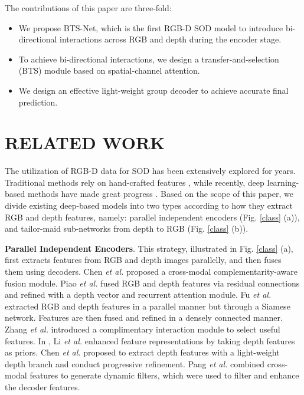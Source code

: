 \documentclass{article}
\begin{document}
The contributions of this paper are three-fold:
\vspace{-0.2cm}
\begin{itemize}
  \item We propose BTS-Net, which is the first RGB-D SOD model to introduce bi-directional interactions across RGB and depth during the encoder stage. \vspace{-0.2cm}
  
  \item To achieve bi-directional interactions, we design a transfer-and-selection (BTS) module based on spatial-channel attention. \vspace{-0.2cm}
  
  \item We design an effective light-weight group decoder to achieve accurate final prediction.
\end{itemize}





\section{RELATED WORK}\vspace{-0.2cm}

The utilization of RGB-D data for SOD has been extensively explored for years. Traditional methods rely on hand-crafted features \cite{cheng2014Depth,2013An,2012Context,2015Exploiting}, while recently, deep learning-based methods have made great progress \cite{PCF,HDFNet,UCNet,DRMA,JLDCF,SSF,cmMS,PGAR,PDNet,CPFP,BBSNet,MMCI,A2dele,CoNet,D3Net,DANet}. Based on the scope of this paper, we divide existing deep-based models into two types according to how they extract RGB and depth features, namely: parallel independent encoders (Fig. \ref{class} (a)), and tailor-maid sub-networks from depth to RGB (Fig. \ref{class} (b)).



\textbf{Parallel Independent Encoders}. 
This strategy, illustrated in Fig. \ref{class} (a), first extracts features from RGB and depth images parallelly, and then fuses them using decoders. Chen \textit{et al.} \cite{PCF} proposed a cross-modal complementarity-aware fusion module. Piao \textit{et al.} \cite{DRMA} fused RGB and depth features via residual connections and refined with a depth vector and recurrent attention module. Fu \textit{et al.} \cite{JLDCF} extracted  RGB and depth features in a parallel manner but through a Siamese network. Features are then fused and refined in a densely connected manner. Zhang \textit{et al.} \cite{SSF} introduced a complimentary interaction module to select useful features. In \cite{cmMS}, Li \textit{et al.} enhanced feature representations by taking depth features as priors. Chen \textit{et al.} \cite{PGAR} proposed to extract depth features with a light-weight depth branch and conduct progressive refinement. Pang \textit{et al.} \cite{HDFNet} combined cross-modal features to generate dynamic filters, which were used to filter and enhance the decoder features. 
\end{document}
